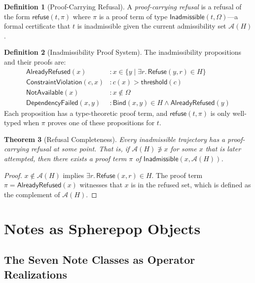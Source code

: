 \documentclass[12pt, a4paper, openany]{book}
\theoremstyle{plain}
\newtheorem{theorem}{Theorem}[chapter]
\theoremstyle{definition}
\newtheorem{definition}[theorem]{Definition}
\theoremstyle{remark}
\newcommand{\Refuse}{\mathsf{Refuse}}
\newcommand{\Bind}{\mathsf{Bind}}
\newcommand{\calA}{\mathcal{A}}
\begin{document}
\begin{definition}[Proof-Carrying Refusal]
A \emph{proof-carrying refusal} is a refusal of the form
$\mathsf{refuse}(t, \pi)$ where $\pi$ is a proof term of type
$\mathsf{Inadmissible}(t, \Omega)$---a formal certificate that $t$ is inadmissible
given the current admissibility set $\calA(H)$.
\end{definition}

\begin{definition}[Inadmissibility Proof System]
The inadmissibility propositions and their proofs are:
\begin{align*}
\mathsf{AlreadyRefused}(x) &: x \in \{y \mid \exists r.\, \Refuse(y,r) \in H\} \\
\mathsf{ConstraintViolation}(c, x) &: c(x) > \mathsf{threshold}(c) \\
\mathsf{NotAvailable}(x) &: x \notin \Omega \\
\mathsf{DependencyFailed}(x, y) &: \Bind(x,y) \in H \wedge \mathsf{AlreadyRefused}(y)
\end{align*}
Each proposition has a type-theoretic proof term, and $\mathsf{refuse}(t, \pi)$
is only well-typed when $\pi$ proves one of these propositions for $t$.
\end{definition}

\begin{theorem}[Refusal Completeness]
Every inadmissible trajectory has a proof-carrying refusal at some point.
That is, if $\calA(H) \not\ni x$ for some $x$ that is later attempted, then
there exists a proof term $\pi$ of $\mathsf{Inadmissible}(x, \calA(H))$.
\end{theorem}

\begin{proof}
$x \notin \calA(H)$ implies $\exists r.\, \Refuse(x, r) \in H$. The proof term
$\pi = \mathsf{AlreadyRefused}(x)$ witnesses that $x$ is in the refused set,
which is defined as the complement of $\calA(H)$.
\end{proof}

\part{Notes as Spherepop Objects}

\chapter{The Seven Note Classes as Operator Realizations}
\end{document}
